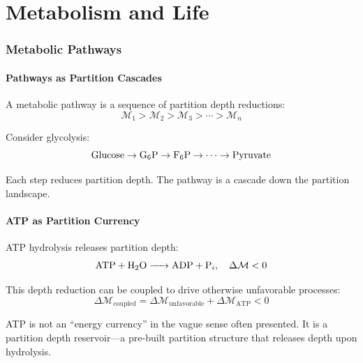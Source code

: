\documentclass[twocolumn,10pt,a4paper]{article}
\theoremstyle{definition}
\theoremstyle{remark}
\newcommand{\Depth}{\mathcal{M}}
\begin{document}
\part{Metabolism and Life}

\section{Metabolic Pathways}
\label{sec:metabolism}

\subsection{Pathways as Partition Cascades}

A metabolic pathway is a sequence of partition depth reductions:
\begin{equation}
    \Depth_1 > \Depth_2 > \Depth_3 > \cdots > \Depth_n
\end{equation}

Consider glycolysis:
\begin{equation}
    \ce{Glucose} \to \ce{G6P} \to \ce{F6P} \to \cdots \to \ce{Pyruvate}
\end{equation}

Each step reduces partition depth. The pathway is a cascade down the partition landscape.

\subsection{ATP as Partition Currency}

ATP hydrolysis releases partition depth:
\begin{equation}
    \ce{ATP + H2O -> ADP + P_i}, \quad \Delta\Depth < 0
\end{equation}

This depth reduction can be coupled to drive otherwise unfavorable processes:
\begin{equation}
    \Delta\Depth_{\mathrm{coupled}} = \Delta\Depth_{\mathrm{unfavorable}} + \Delta\Depth_{\mathrm{ATP}} < 0
\end{equation}

ATP is not an ``energy currency'' in the vague sense often presented. It is a partition depth reservoir---a pre-built partition structure that releases depth upon hydrolysis.
\end{document}
